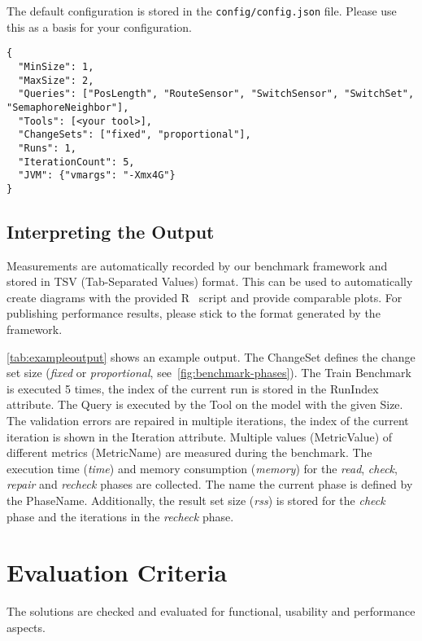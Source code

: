 \documentclass[submission,copyright,creativecommons]{eptcs}
\newcommand{\figref}[1]{\autoref{fig:#1}}
\begin{document}
The default configuration is stored in the \texttt{config/config.json} file. Please use this as a basis for your configuration.

\begin{lstlisting}
{
  "MinSize": 1,
  "MaxSize": 2,
  "Queries": ["PosLength", "RouteSensor", "SwitchSensor", "SwitchSet", "SemaphoreNeighbor"],
  "Tools": [<your tool>],
  "ChangeSets": ["fixed", "proportional"],
  "Runs": 1,
  "IterationCount": 5,
  "JVM": {"vmargs": "-Xmx4G"}
}
\end{lstlisting}


\subsection{Interpreting the Output}

Measurements are automatically recorded by our benchmark framework and stored in TSV (Tab-Separated Values) format. This can be used to automatically create diagrams with the provided R~\cite{RProject} script and provide comparable plots. For publishing performance results, please stick to the format generated by the framework.

\autoref{tab:exampleoutput} shows an example output. The \textsf{ChangeSet} defines the change set size (\emph{fixed} or \emph{proportional}, see~\figref{benchmark-phases}). The Train Benchmark is executed 5 times, the index of the current run is stored in the \textsf{RunIndex} attribute. The \textsf{Query} is executed by the \textsf{Tool} on the model with the given \textsf{Size}. The validation errors are repaired in multiple iterations, the index of the current iteration is shown in the \textsf{Iteration} attribute. Multiple values (\textsf{MetricValue}) of different metrics (\textsf{MetricName}) are measured during the benchmark. The execution time (\textit{time}) and memory consumption (\textit{memory}) for the \textit{read}, \textit{check}, \textit{repair} and \textit{recheck} phases are collected. The name the current phase is defined by the \textsf{PhaseName}. Additionally, the result set size (\textit{rss}) is stored for the \textit{check} phase and the iterations in the \textit{recheck} phase.

\section{Evaluation Criteria}

The solutions are checked and evaluated for functional, usability and performance aspects.
\end{document}
